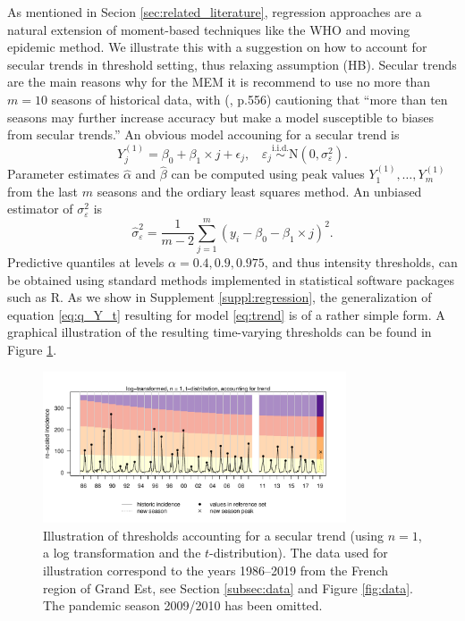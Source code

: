 \documentclass[12pt]{article}
\begin{document}
As mentioned in Secion \ref{sec:related_literature}, regression approaches are a natural extension of moment-based techniques like the WHO and moving epidemic method. We illustrate this with a suggestion on how to account for secular trends in threshold setting, thus relaxing assumption (HB). Secular trends are the main reasons why for the MEM it is recommend to use no more than $m = 10$ seasons of historical data, with \citeauthor{Vega2013} (\citeyear{Vega2013}, p.556) cautioning that ``more than ten seasons may further increase accuracy but make a model susceptible to biases from secular trends.'' An obvious model accouning for a secular trend is
\begin{equation}
Y_j^{(1)} = \beta_0 + \beta_1 \times j + \epsilon_j, \ \ \ \ \varepsilon_j \stackrel{\text{i.i.d.}}{\sim} \text{N}(0, \sigma^2_\varepsilon).\label{eq:trend}
\end{equation}
Parameter estimates $\hat{\alpha}$ and $\hat{\beta}$ can be computed using peak values $Y_1^{(1)}, \dots, Y_m^{(1)}$ from the last $m$ seasons and the ordiary least squares method. An unbiased estimator of ${\sigma}^2_\varepsilon$ is
$$
\hat{\sigma}^2_\varepsilon = \frac{1}{m - 2} \sum_{j = 1}^m (y_i - \beta_0 - \beta_1 \times j)^2.
$$
Predictive quantiles at levels $\alpha = 0.4, 0.9, 0.975$, and thus intensity thresholds, can be obtained using standard methods implemented in statistical software packages such as R. As we show in Supplement \ref{suppl:regression}, the generalization of equation \eqref{eq:q_Y_t} resulting for model \eqref{eq:trend} is of a rather simple form. A graphical illustration of the resulting time-varying thresholds can be found in Figure \ref{fig:illustration_trend}. 

\begin{figure}[h!]
\begin{center}
\includegraphics[width = 0.8\textwidth]{figure/illustration_trend.pdf}
\end{center}
\caption{Illustration of thresholds accounting for a secular trend (using $n = 1$, a log transformation and the $t$-distribution). The data used for illustration correspond to the years 1986--2019 from the French region of Grand Est, see Section \ref{subsec:data} and Figure \ref{fig:data}. The pandemic season 2009/2010 has been omitted.}
\label{fig:illustration_trend}
\end{figure}
\end{document}
